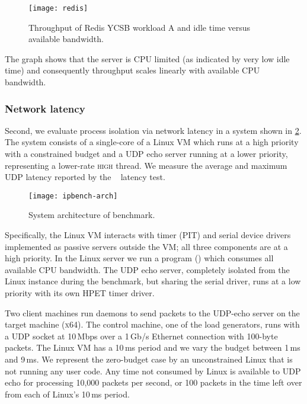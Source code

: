 \begin{figure}[h]
  \centering
  \texttt{[image: redis]}
  \caption[Results of Redis isolation benchmark.]{Throughput of Redis YCSB workload A and idle time versus available bandwidth.}
  \label{f:redis}
\end{figure}

The graph shows that the server is CPU limited (as indicated by very low idle time)
and consequently throughput scales linearly with available CPU
bandwidth.

\subsubsection{Network latency}

Second, we evaluate process isolation via network latency in a system shown in \cref{f:ipbench-arch}. 
The system consists of a single-core of a Linux \gls{VM} which runs at a high priority with a
constrained budget and a \gls{UDP} echo server running at a lower priority,
representing a lower-rate \textsc{high} thread. We
measure the average  and maximum UDP latency reported by the
~\citep{Wienand_Macpherson_04} latency test.

\begin{figure}[h]
    \centering
    \texttt{[image: ipbench-arch]}
    \caption{System architecture of  benchmark.}
    \label{f:ipbench-arch}
\end{figure}


Specifically, the Linux VM interacts with timer (PIT) and serial device drivers implemented as
passive servers outside the \gls{VM}; all three components are at a high priority. In the Linux server we
run a program () which consumes all available
CPU bandwidth.  The UDP echo server, completely isolated from the Linux instance during the
benchmark, but sharing the
serial driver, runs at a low priority with its own HPET timer
driver.

Two client machines run  daemons to send packets to the UDP-echo server on the target machine
(\textsc{x64}). The control machine, one of the load generators, runs  with a \gls{UDP} socket at 10\,Mbps over a 1\,Gb/s Ethernet connection with 100-byte packets. The Linux VM has a 10\,ms period and we vary the
budget between 1\,ms and 9\,ms.
We represent the zero-budget case by an unconstrained Linux that is not running any user code.
Any time not consumed by Linux is available to UDP echo for processing
10,000 packets per second, or 100 packets in the time left over from
each of Linux's 10\,ms period.

